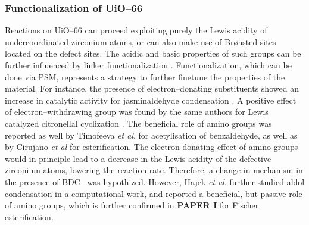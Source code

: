 \subsubsection*{Functionalization of UiO--66}
Reactions on UiO--66 can proceed exploiting purely the Lewis acidity of undercoordinated zirconium atoms, or can also make use of Br\o{}nsted sites located on the defect sites. The acidic and basic properties of such groups can be further influenced by linker functionalization \cite{kandiah2010synthesis, kandiah2010post, kim2012discovery}. Functionalization, which can be done via PSM, represents a strategy to further finetune the properties of the material. 
For instance, the presence of electron--donating substituents showed an increase in catalytic activity for jasminaldehyde condensation \cite{vermoortele2011amino}. A positive effect of electron--withdrawing group was found by the same authors for Lewis catalyzed citronellal cyclization \cite{vermoortele2012electronic}. The beneficial role of amino groups was reported as well by Timofeeva \textit{et al}. \cite{timofeeva2014effects} for acetylisation of benzaldehyde, as well as by Cirujano \textit{et al} \cite{cirujano2015zirconium, cirujano2015conversion} for esterification. The electron donating effect of amino groups would in principle lead to a decrease in the Lewis acidity of the defective zirconium atoms, lowering the reaction rate. Therefore, a change in mechanism in the presence of BDC-- was hypothized. However, Hajek \textit{et al}. further studied aldol condensation in a computational work\cite{hajek2015mechanistic}, and reported a beneficial, but passive role of amino groups, which is further confirmed in \textbf{PAPER I} for Fischer esterification. 

